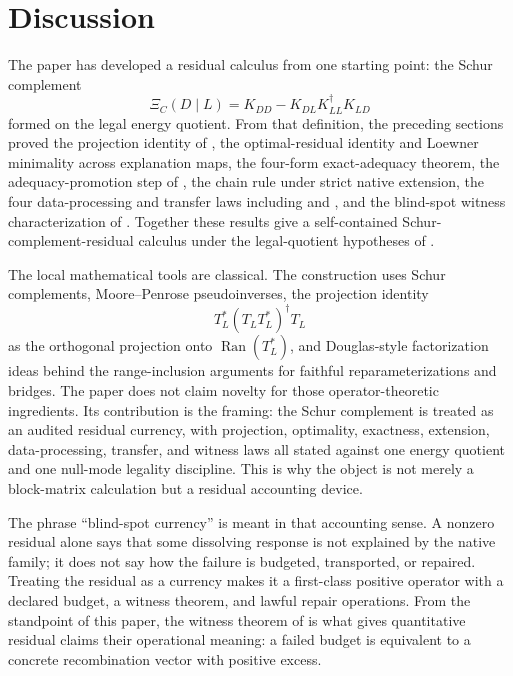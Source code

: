 \documentclass[11pt]{article}
\DeclareMathOperator{\Ran}{Ran}
\theoremstyle{definition}
\begin{document}
\section{Discussion}
\label{sec:discussion}

The paper has developed a residual calculus from one starting point: the Schur
complement
\[
  \Xi_C(D\mid L)=K_{DD}-K_{DL}K_{LL}^\dagger K_{LD}
\]
formed on the legal energy quotient.  From that definition, the preceding
sections proved the projection identity of , the
optimal-residual identity and Loewner minimality across explanation maps, the
four-form exact-adequacy theorem, the adequacy-promotion step of
, the chain rule under strict native
extension, the four data-processing and transfer laws including
 and
, and the blind-spot witness characterization of
.  Together these results give a self-contained
Schur-complement-residual calculus under the legal-quotient hypotheses of
.

The local mathematical tools are classical.  The construction uses Schur
complements, Moore--Penrose pseudoinverses, the projection identity
\[
  T_L^*(T_LT_L^*)^\dagger T_L
\]
as the orthogonal projection onto \(\Ran(T_L^*)\), and Douglas-style
factorization ideas behind the range-inclusion arguments for faithful
reparameterizations and bridges.  The paper does not claim novelty for those
operator-theoretic ingredients.  Its contribution is the framing: the Schur
complement is treated as an audited residual currency, with projection,
optimality, exactness, extension, data-processing, transfer, and witness laws
all stated against one energy quotient and one null-mode legality discipline.
This is why the object is not merely a block-matrix calculation but a residual
accounting device.

The phrase ``blind-spot currency'' is meant in that accounting sense.  A
nonzero residual alone says that some dissolving response is not explained by
the native family; it does not say how the failure is budgeted, transported, or
repaired.  Treating the residual as a currency makes it a first-class positive
operator with a declared budget, a witness theorem, and lawful repair
operations.  From the standpoint of this paper, the witness theorem of
 is what gives quantitative residual claims their
operational meaning: a failed budget is equivalent to a concrete recombination
vector with positive excess.
\end{document}
